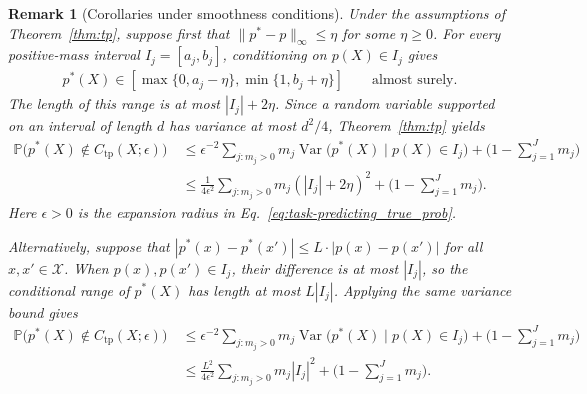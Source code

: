 \documentclass[11pt]{article}
\theoremstyle{statplain}
\theoremstyle{statdefinition}
\newtheorem{remark}[theorem]{Remark}
\DeclareMathOperator{\Var}{Var}
\newcommand{\tp}{\mathrm{tp}}
\newcommand{\E}{\mathbb{E}}
\newcommand{\PP}{\mathbb{P}}
\newcommand{\0}{\mathbf{0}}
\newcommand{\J}{\mathcal{J}}
\newcommand{\X}{\mathcal{X}}
\newcommand{\Xuelin}[1]{{\color{myGold}[Xuelin: #1]}}
\newcommand{\interval}{I} %
\newcommand{\numInterval}{J} %
\newcommand{\iteratorInterval}{j}
\newcommand{\titleShort}{PICPI\xspace}
\begin{document}
\begin{remark}[Corollaries under smoothness conditions]
Under the assumptions of Theorem~\ref{thm:tp}, suppose first that
$\|p^*-p\|_\infty\leq\eta$ for some $\eta\geq0$.
For every positive-mass interval $\interval_j=[a_j,b_j]$, conditioning
on $p(X)\in\interval_j$ gives
\begin{align*}
 p^*(X)\in[\max\{0,a_j-\eta\},\min\{1,b_j+\eta\}]
 \qquad\text{almost surely}.
\end{align*}
The length of this range is at most $|\interval_j|+2\eta$.
Since a random variable supported on an interval of length $d$ has
variance at most $d^2/4$, Theorem~\ref{thm:tp} yields
\begin{align*}
 \PP\Big(p^*(X)\notin C_{\tp}(X;\epsilon)\Big) &~\leq\epsilon^{-2}\sum_{j:m_j>0}m_j
 \Var\Big(p^*(X)\mid p(X)\in\interval_j\Big)
 +\Big(1-\sum_{j=1}^{\numInterval}m_j\Big)\\
 &~\leq\frac{1}{4\epsilon^2}\sum_{j:m_j>0}
 m_j(|\interval_j|+2\eta)^2
 +\Big(1-\sum_{j=1}^{\numInterval}m_j\Big).
\end{align*}
Here $\epsilon>0$ is the expansion radius in
Eq.~\eqref{eq:task-predicting_true_prob}.

Alternatively, suppose that
$|p^*(x)-p^*(x')|\leq L\cdot|p(x)-p(x')|$ for all $x,x'\in\X$.
When $p(x),p(x')\in\interval_j$, their difference is at most
$|\interval_j|$, so the conditional range of $p^*(X)$ has length
at most $L|\interval_j|$. Applying the same variance bound gives
\begin{align*}
 \PP\Big(p^*(X)\notin C_{\tp}(X;\epsilon)\Big)&~\leq\epsilon^{-2}\sum_{j:m_j>0}m_j
 \Var\Big(p^*(X)\mid p(X)\in\interval_j\Big)
 +\Big(1-\sum_{j=1}^{\numInterval}m_j\Big)\\
 &~\leq\frac{L^2}{4\epsilon^2}\sum_{j:m_j>0}
 m_j|\interval_j|^2
 +\Big(1-\sum_{j=1}^{\numInterval}m_j\Big).
\end{align*}
\end{remark}

\end{document}
